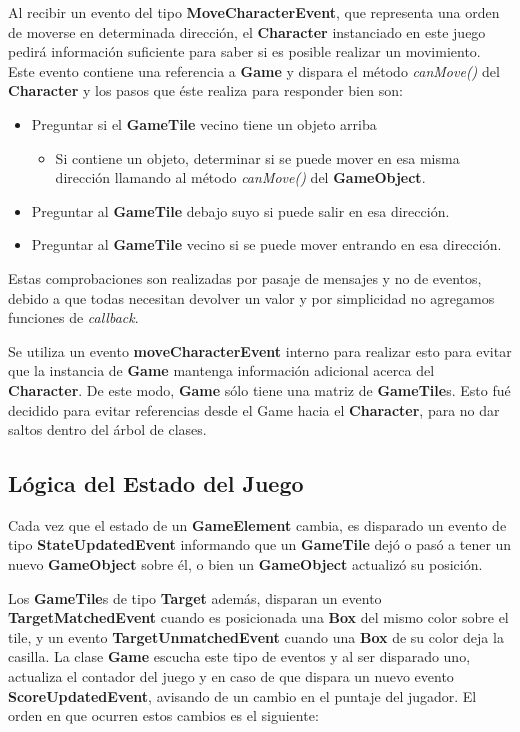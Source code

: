 \documentclass[a4paper,12pt,titlepage]{article}
\begin{document}
Al recibir un evento del tipo \textbf{MoveCharacterEvent}, que representa una orden de moverse en determinada dirección, el \textbf{Character} instanciado en este juego pedirá información suficiente para saber si es posible realizar un movimiento.
Este evento contiene una referencia a \textbf{Game} y dispara el método \emph{canMove()} del \textbf{Character} y los pasos que éste realiza para responder bien son:

\begin{itemize}
 \item Preguntar si el \textbf{GameTile} vecino tiene un objeto arriba
 \begin{itemize}
  \item Si contiene un objeto, determinar si se puede mover en esa misma dirección llamando al método \textit{canMove()} del \textbf{GameObject}.
 \end{itemize}
 \item Preguntar al \textbf{GameTile} debajo suyo si puede salir en esa dirección.
 \item Preguntar al \textbf{GameTile} vecino si se puede mover entrando en esa dirección.
\end{itemize}

Estas comprobaciones son realizadas por pasaje de mensajes y no de eventos, debido a que todas necesitan devolver un valor y por simplicidad no agregamos funciones de \emph{callback}.

Se utiliza un evento \textbf{moveCharacterEvent} interno para realizar esto para evitar que la instancia de \textbf{Game} mantenga información adicional acerca del \textbf{Character}. De este modo, \textbf{Game} sólo tiene una matriz de \textbf{GameTile}s. Esto fué decidido para evitar referencias desde el Game hacia el \textbf{Character}, para no dar saltos dentro del árbol de clases.

\subsection{Lógica del Estado del Juego}

Cada vez que el estado de un \textbf{GameElement} cambia, es disparado un evento de tipo \textbf{StateUpdatedEvent} informando que un \textbf{GameTile} dejó o pasó a tener un nuevo \textbf{GameObject} sobre él, o bien un \textbf{GameObject} actualizó su posición.

Los \textbf{GameTile}s de tipo \textbf{Target} además, disparan un evento \textbf{TargetMatchedEvent} cuando es posicionada una \textbf{Box} del mismo color sobre el tile, y un evento \textbf{TargetUnmatchedEvent} cuando una \textbf{Box} de su color deja la casilla. La clase \textbf{Game} escucha este tipo de eventos y al ser disparado uno, actualiza el contador del juego y en caso de que dispara un nuevo evento \textbf{ScoreUpdatedEvent}, avisando de un cambio en el puntaje del jugador. El orden en que ocurren estos cambios es el siguiente:
\end{document}

